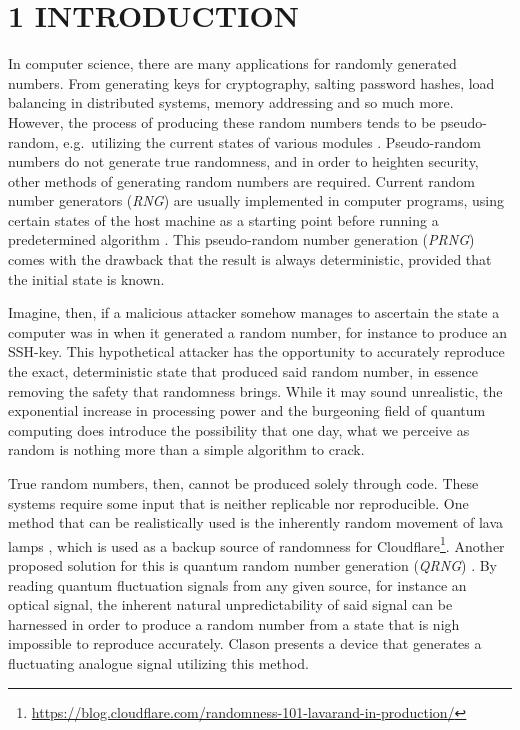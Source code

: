 \section{1 INTRODUCTION}\label{introduction}

In computer science, there are many applications for randomly generated numbers. From generating keys for cryptography, salting password hashes, load balancing in distributed systems, memory addressing and so much more. However, the process of producing these random numbers tends to be pseudo-random, e.g.~utilizing the current states of various modules \cite{randomness}. Pseudo-random numbers do not generate true randomness, and in order to heighten security, other methods of generating random numbers are required. Current random number generators (\emph{RNG}) are usually implemented in computer programs, using certain states of the host machine as a starting point before running a predetermined algorithm \cite{randomness}. This pseudo-random number generation (\emph{PRNG}) comes with the drawback that the result is always deterministic, provided that the initial state is known.

Imagine, then, if a malicious attacker somehow manages to ascertain the state a computer was in when it generated a random number, for instance to produce an SSH-key. This hypothetical attacker has the opportunity to accurately reproduce the exact, deterministic state that produced said random number, in essence removing the safety that randomness brings. While it may sound unrealistic, the exponential increase in processing power and the burgeoning field of quantum computing does introduce the possibility that one day, what we perceive as random is nothing more than a simple algorithm to crack.

True random numbers, then, cannot be produced solely through code. These systems require some input that is neither replicable nor reproducible. One method that can be realistically used is the inherently random movement of lava lamps \cite{lavarand}, which is used as a backup source of randomness for Cloudflare\footnote{\url{https://blog.cloudflare.com/randomness-101-lavarand-in-production/}}. Another proposed solution for this is quantum random number generation (\emph{QRNG}) \cite{QRNG}. By reading quantum fluctuation signals from any given source, for instance an optical signal, the inherent natural unpredictability of said signal can be harnessed in order to produce a random number from a state that is nigh impossible to reproduce accurately. Clason \cite{Clason2023} presents a device that generates a fluctuating analogue signal utilizing this method.

